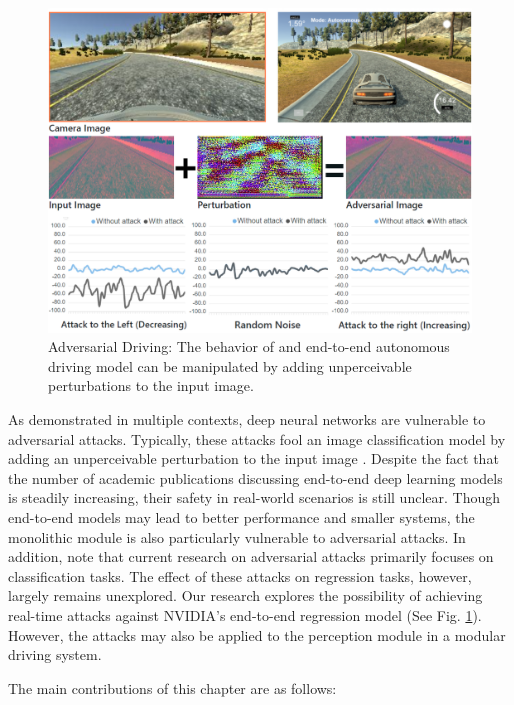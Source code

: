 \begin{figure}[H]
    \centering
    \includegraphics[width=\textwidth]{figures/chapter_driving/overview.png}
    \caption{Adversarial Driving: The behavior of and end-to-end autonomous driving model can be manipulated by adding unperceivable perturbations to the input image.}
    \label{fig:adv_drv}
\end{figure} 

As demonstrated in multiple contexts, deep neural networks are vulnerable to adversarial attacks. Typically, these attacks fool an image classification model by adding an unperceivable perturbation to the input image \citep{goodfellow2014explaining}. Despite the fact that the number of academic publications discussing end-to-end deep learning models is steadily increasing, their safety in real-world scenarios is still unclear. Though end-to-end models may lead to better performance and smaller systems, the monolithic module is also particularly vulnerable to adversarial attacks. In addition, note that current research on adversarial attacks primarily focuses on classification tasks. The effect of these attacks on regression tasks, however, largely remains unexplored. Our research explores the possibility of achieving real-time attacks against NVIDIA's end-to-end regression model (See Fig. \ref{fig:adv_drv}). However, the attacks may also be applied to the perception module in a modular driving system.


The main contributions of this chapter are as follows: 


